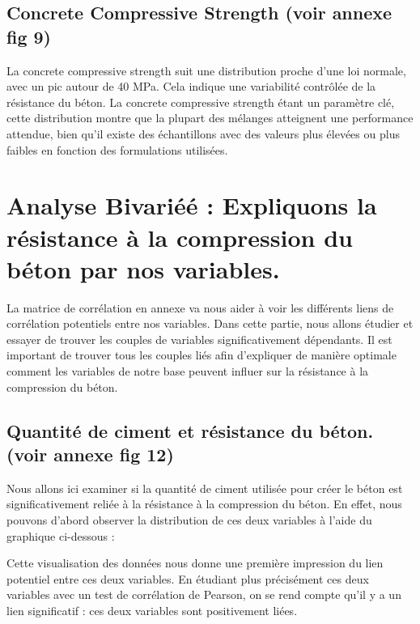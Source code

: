 \documentclass[
  12pt,
]{article}
\begin{document}
\subsection{Concrete Compressive Strength (voir annexe fig
9)}\label{concrete-compressive-strength-voir-annexe-fig-9}

La concrete compressive strength suit une distribution proche d'une loi
normale, avec un pic autour de 40 MPa. Cela indique une variabilité
contrôlée de la résistance du béton. La concrete compressive strength
étant un paramètre clé, cette distribution montre que la plupart des
mélanges atteignent une performance attendue, bien qu'il existe des
échantillons avec des valeurs plus élevées ou plus faibles en fonction
des formulations utilisées.

\section{Analyse Bivariéé : Expliquons la résistance à la compression du
béton par nos
variables.}\label{analyse-bivariuxe9uxe9-expliquons-la-ruxe9sistance-uxe0-la-compression-du-buxe9ton-par-nos-variables.}

La matrice de corrélation en annexe va nous aider à voir les différents
liens de corrélation potentiels entre nos variables. Dans cette partie,
nous allons étudier et essayer de trouver les couples de variables
significativement dépendants. Il est important de trouver tous les
couples liés afin d'expliquer de manière optimale comment les variables
de notre base peuvent influer sur la résistance à la compression du
béton.

\subsection{Quantité de ciment et résistance du béton. (voir annexe fig
12)}\label{quantituxe9-de-ciment-et-ruxe9sistance-du-buxe9ton.-voir-annexe-fig-12}

Nous allons ici examiner si la quantité de ciment utilisée pour créer le
béton est significativement reliée à la résistance à la compression du
béton. En effet, nous pouvons d'abord observer la distribution de ces
deux variables à l'aide du graphique ci-dessous :

Cette visualisation des données nous donne une première impression du
lien potentiel entre ces deux variables. En étudiant plus précisément
ces deux variables avec un test de corrélation de Pearson, on se rend
compte qu'il y a un lien significatif : ces deux variables sont
positivement liées.
\end{document}

